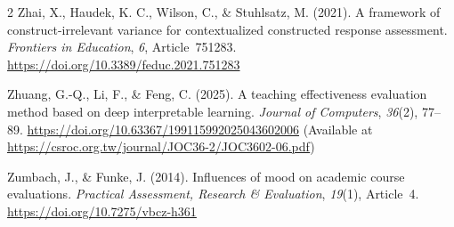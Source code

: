 \documentclass{article}
\begin{document}
\begin{multicols*}{2}
Zhai, X., Haudek, K. C., Wilson, C., \& Stuhlsatz, M. (2021). A framework of construct-irrelevant variance for contextualized constructed response assessment. \textit{Frontiers in Education}, \textit{6}, Article~751283. \url{https://doi.org/10.3389/feduc.2021.751283}

Zhuang, G.-Q., Li, F., \& Feng, C. (2025). A teaching effectiveness evaluation method based on deep interpretable learning. \textit{Journal of Computers}, \textit{36}(2), 77--89. \url{https://doi.org/10.63367/199115992025043602006} (Available at \url{https://csroc.org.tw/journal/JOC36-2/JOC3602-06.pdf})

Zumbach, J., \& Funke, J. (2014). Influences of mood on academic course evaluations. \textit{Practical Assessment, Research \& Evaluation}, \textit{19}(1), Article~4. \url{https://doi.org/10.7275/vbcz-h361}

\endgroup
\end{multicols*}
\end{document}
